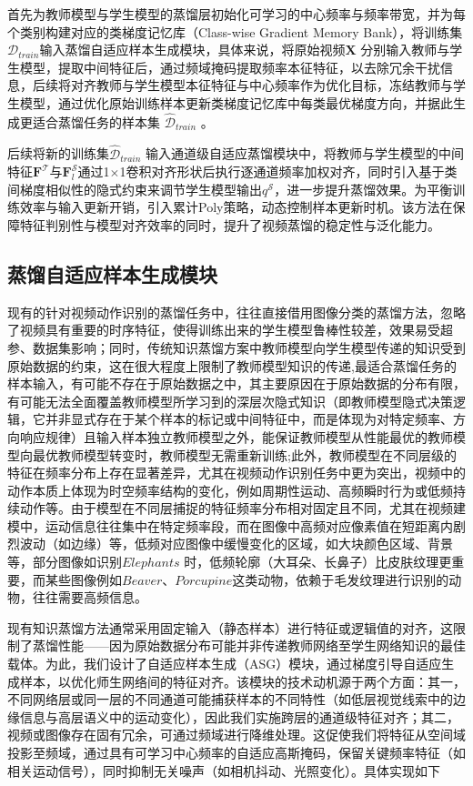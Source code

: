 \documentclass[10.5pt,letterpaper]{article}
\begin{document}
首先为教师模型与学生模型的蒸馏层初始化可学习的中心频率与频率带宽，并为每个类别构建对应的类梯度记忆库（Class-wise Gradient Memory Bank），将训练集$\mathcal{D}_{train}$输入蒸馏自适应样本生成模块，具体来说，将原始视频$\textbf{X}$ 分别输入教师与学生模型，提取中间特征后，通过频域掩码提取频率本征特征，以去除冗余干扰信息，后续将对齐教师与学生模型本征特征与中心频率作为优化目标，冻结教师与学生模型，通过优化原始训练样本更新类梯度记忆库中每类最优梯度方向，并据此生成更适合蒸馏任务的样本集 $\hat{\mathcal{D}}_{train}$ 。

后续将新的训练集$\hat{\mathcal{D}}_{train}$ 输入通道级自适应蒸馏模块中，将教师与学生模型的中间特征$\textbf{F}^\mathcal{T}$与$\textbf{F}_l^\mathcal{S}$通过1$\times$1卷积对齐形状后执行逐通道频率加权对齐，同时引入基于类间梯度相似性的隐式约束来调节学生模型输出$q^{\mathcal{S}}$，进一步提升蒸馏效果。为平衡训练效率与输入更新开销，引入累计Poly策略\cite{wu-tist2023-poly}，动态控制样本更新时机。该方法在保障特征判别性与模型对齐效率的同时，提升了视频蒸馏的稳定性与泛化能力。


\subsection{蒸馏自适应样本生成模块} 
现有的针对视频动作识别的蒸馏任务中，往往直接借用图像分类的蒸馏方法，忽略了视频具有重要的时序特征，使得训练出来的学生模型鲁棒性较差，效果易受超参、数据集影响；同时，传统知识蒸馏方案中教师模型向学生模型传递的知识受到原始数据的约束，这在很大程度上限制了教师模型知识的传递,最适合蒸馏任务的样本输入，有可能不存在于原始数据之中，其主要原因在于原始数据的分布有限，有可能无法全面覆盖教师模型所学习到的深层次隐式知识（即教师模型隐式决策逻辑，它并非显式存在于某个样本的标记或中间特征中，而是体现为对特定频率、方向响应规律）且输入样本独立教师模型之外，能保证教师模型从性能最优的教师模型向最优教师模型转变时，教师模型无需重新训练;此外，教师模型在不同层级的特征在频率分布上存在显著差异，尤其在视频动作识别任务中更为突出，视频中的动作本质上体现为时空频率结构的变化，例如周期性运动、高频瞬时行为或低频持续动作等。由于模型在不同层捕捉的特征频率分布相对固定且不同，尤其在视频建模中，运动信息往往集中在特定频率段，而在图像中高频对应像素值在短距离内剧烈波动（如边缘）等，低频对应图像中缓慢变化的区域，如大块颜色区域、背景等，部分图像如识别$Elephants$
时，低频轮廓（大耳朵、长鼻子）比皮肤纹理更重要，而某些图像例如$Beaver$、$Porcupine$这类动物，依赖于毛发纹理进行识别的动物，往往需要高频信息。

现有知识蒸馏方法通常采用固定输入（静态样本）进行特征或逻辑值的对齐，这限制了蒸馏性能——因为原始数据分布可能并非传递教师网络至学生网络知识的最佳载体。为此，我们设计了自适应样本生成（ASG）模块，通过梯度引导自适应生成样本，以优化师生网络间的特征对齐。该模块的技术动机源于两个方面：其一，不同网络层或同一层的不同通道可能捕获样本的不同特性（如低层视觉线索中的边缘信息与高层语义中的运动变化），因此我们实施跨层的通道级特征对齐；其二，视频或图像存在固有冗余，可通过频域进行降维处理。这促使我们将特征从空间域投影至频域，通过具有可学习中心频率的自适应高斯掩码，保留关键频率特征（如相关运动信号），同时抑制无关噪声（如相机抖动、光照变化）。具体实现如下
\end{document}
